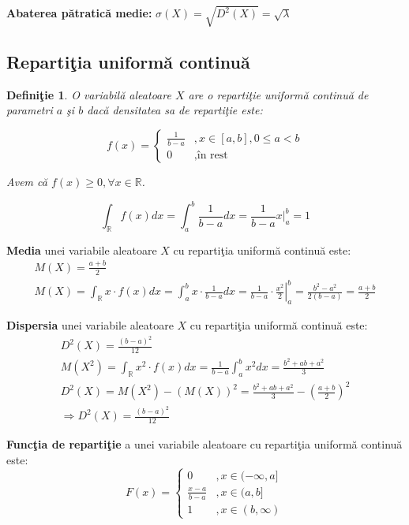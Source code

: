 \documentclass[12pt]{article}
\newtheorem{definition}{Definiţie}
\begin{document}
\noindent \textbf{Abaterea pătratică medie:} $\sigma(X) = \sqrt{D^2(X)} = \sqrt{\lambda}$

\subsection*{Repartiţia uniformă continuă}

\begin{definition}
	O variabilă aleatoare $X$ are o repartiţie uniformă continuă de parametri $a$ şi $b$ dacă densitatea sa de repartiţie este:

	\[
		f(x) = \begin{cases}
			\frac{1}{b - a} &, x \in [a, b], 0 \leq a < b \\
			0 &, \text{în rest}
		\end{cases}
	\]

	Avem că $f(x) \geq 0, \forall x \in \mathbb{R}$.

	\[
		\int_{\mathbb{R}} f(x)dx = \int_a^b \frac{1}{b - a} dx = \frac{1}{b - a} \left. x \right|_a^b = 1
	\]
\end{definition}

\textbf{Media} unei variabile aleatoare $X$ cu repartiţia uniformă continuă este:
\begin{gather*}
	M(X) = \frac{a + b}{2} \\
	M(X) = \int_{\mathbb{R}} x\cdot f(x)dx = \int_a^b x\cdot \frac{1}{b - a} dx = \frac{1}{b - a} \cdot \left. \frac{x^2}{2} \right|_a^b = \frac{b^2 - a^2}{2(b - a)} = \frac{a + b}{2}
\end{gather*}

\textbf{Dispersia} unei variabile aleatoare $X$ cu repartiţia uniformă continuă este:
\begin{gather*}
	D^2(X) = \frac{(b-a)^2}{12} \\
	M(X^2) = \int_{\mathbb{R}} x^2 \cdot f(x) dx = \frac{1}{b - a} \int_a^b x^2 dx = \frac{b^2 + ab + a^2}{3} \\
	D^2(X) = M(X^2) - (M(X))^2 = \frac{b^2 + ab + a^2}{3} - \left( \frac{a+b}{2} \right)^2 \\
	\Longrightarrow D^2(X) = \frac{(b - a)^2}{12}
\end{gather*}

\textbf{Funcţia de repartiţie} a unei variabile aleatoare cu repartiţia uniformă continuă este:
\[
	F(x) = \begin{cases}
		0 & ,x \in (-\infty, a] \\
		\frac{x - a}{b - a} & ,x \in (a, b] \\
		1 &, x \in (b, \infty)
	\end{cases}
\]
\end{document}
